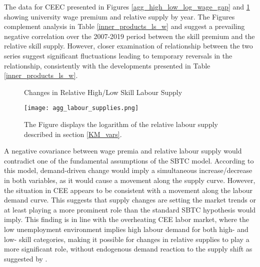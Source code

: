\documentclass[11pt]{article}
\begin{document}
The data for CEEC presented in Figures \ref{agg_high_low_log_wage_gap} and \ref{agg_labour_supplies} showing university wage premium and relative supply by year. The Figures complement analysis in Table \ref{inner_products_ls_w} and suggest a prevailing negative correlation over the 2007-2019 period between the skill premium and the relative skill supply. However, closer examination of relationship between the two series suggest significant fluctuations leading to temporary reversals in the relationship, consistently with the developments presented in Table \ref{inner_products_ls_w}.  %


\begin{figure}[!htbp]%
    \centering
    \caption{Changes in Relative High/Low Skill Labour Supply}
    {\texttt{[image: agg\_labour\_supplies.png]} }
    \label{agg_labour_supplies}
    \caption*{\footnotesize The Figure displays the logarithm of the relative labour supply described in section \ref{KM_vars}.}
\end{figure}

A negative covariance between wage premia and relative labour supply would contradict one of the fundamental assumptions of the SBTC model. According to this model, demand-driven change would imply a simultaneous increase/decrease in both variables, as it would cause a movement along the supply curve. However, the situation in CEE appears to be consistent with a movement along the labour demand curve. This suggests that supply changes are setting the market trends or at least playing a more prominent role than the standard SBTC hypothesis would imply. This finding is in line with the overheating  CEE labor market, where the low unemployment environment implies high labour demand for both high- and low- skill categories, making it possible for changes in relative supplies to play a more significant role,  without endogenous demand reaction to the supply shift as suggested by \citep{acemoglu2002directed}. %
\end{document}
